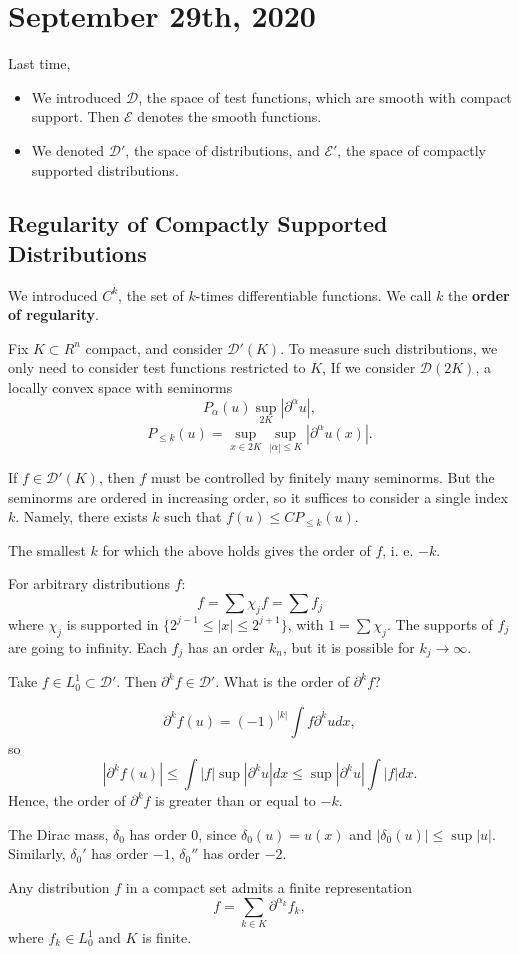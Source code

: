 \documentclass[11pt]{scrartcl}
\begin{document}
\section{September 29th, 2020}
Last time,
\begin{itemize}
\item We introduced $\mathcal{D}$, the space of test functions, which are smooth with compact support.  Then $\mathcal{E}$ denotes the smooth functions.
\item We denoted $\mathcal{D}'$, the space of distributions, and $\mathcal{E}'$, the space of compactly supported distributions.
\end{itemize}
\subsection{Regularity of Compactly Supported Distributions}
We introduced $C^k$, the set of $k$-times differentiable functions.  We call $k$ the \textbf{order of regularity}.

Fix $K \subset R^n$ compact, and consider $\mathcal D'(K)$.  To measure such distributions, we only need to consider test functions restricted to $K$,  If we consider $\mathcal{D}(2K)$, a locally convex space with seminorms $$P_\alpha(u) \sup_{2K}|\partial^\alpha u|,$$
$$P_{\le k}(u) = \sup_{x \in 2K} \sup_{|\alpha| \le K} |\partial^\alpha u(x)|.$$

If $f \in \mathcal D'(K)$, then $f$ must be controlled by finitely many seminorms.  But the seminorms are ordered in increasing order, so it suffices to consider a single index $k$.  Namely, there exists $k$ such that $f(u) \le C P_{\le k}(u).$
\begin{definition} The smallest $k$ for which the above holds gives the order of $f$, i. e. $-k$.
\end{definition}

For arbitrary distributions $f$:
$$f = \sum \chi_{j} f = \sum f_j$$
where $\chi_j$ is supported in $\{2^{j-1} \le |x| \le 2^{j+1}\}$, with $1 = \sum \chi_j$.  The supports of $f_j$ are going to infinity.  Each $f_j$ has an order $k_n$, but it is possible for $k_j \rightarrow \infty$.

\begin{example} Take $f \in L_{0}^1 \subset \mathcal D'$.  Then $\partial^k f \in \mathcal D'$.  What is the order of $\partial^k f$?

$$\partial^k f(u) = (-1)^{|k|} \int f \partial^k u dx,$$
so $$|\partial^k f(u)| \le \int |f| \sup |\partial^k u|dx \le \sup|\partial^k u| \int |f|dx.$$
Hence, the order of $\partial^k f$ is greater than or equal to $-k$.
\end{example}
\begin{example} The Dirac mass, $\delta_0$ has order $0$, since $\delta_0(u) = u(x)$ and $|\delta_0(u)| \le \sup |u|$.  Similarly, $\delta_0'$ has order $-1$, $\delta_0''$ has order $-2$.
\end{example}
\begin{thm} Any distribution $f$ in a compact set admits a finite representation
$$f = \sum_{k \in K}\partial^{\alpha_k}f_k,$$
where $f_k \in L_0^1$ and $K$ is finite.
\end{thm}
\end{document}
